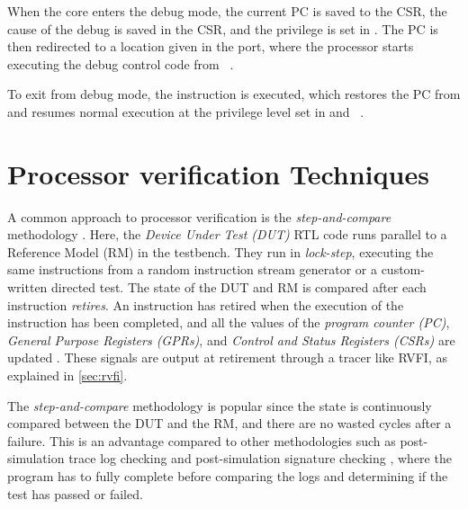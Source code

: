 When the core enters the debug mode, the current PC is saved to the  CSR, the cause of the debug is saved in the  CSR, and the privilege is set in . The PC is then redirected to a location given in the  port, where the processor starts executing the debug control code from ~\cite{openhwgroupDebugTriggerCOREV2023}.

To exit from debug mode, the  instruction is executed, which restores the PC from  and resumes normal execution at the privilege level set in  and ~\cite{pauldonahueRISCVDebugSupport2023}.

\section{Processor verification Techniques}
\label{sec:bg_verificationTech}


A common approach to processor verification is the \textit{step-and-compare} methodology \cite{taylorAdvancedRISCVVerification2023}. Here, the \textit{Device Under Test (DUT)} RTL code runs parallel to a Reference Model (RM) in the testbench. They run in \textit{lock-step}, executing the same instructions from a random instruction stream generator or a custom-written directed test. The state of the DUT and RM is compared after each instruction \textit{retires}. An instruction has retired when the execution of the instruction has been completed, and all the values of the \textit{program counter (PC)}, \textit{General Purpose Registers (GPRs)}, and \textit{Control and Status Registers (CSRs)} are updated \cite{taylorAdvancedRISCVVerification2023}. These signals are output at retirement through a tracer like RVFI, as explained in \cref{sec:rvfi}.

The \textit{step-and-compare} methodology is popular since the state is continuously compared between the DUT and the RM, and there are no wasted cycles after a failure. This is an advantage compared to other methodologies such as post-simulation trace log checking and post-simulation signature checking \cite{duncangrahamRISCVVerificationImplications2023}, where the program has to fully complete before comparing the logs and determining if the test has passed or failed.


